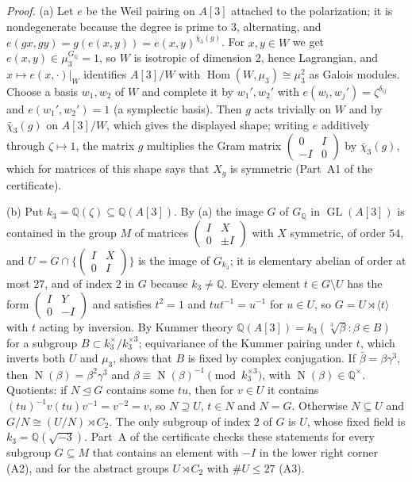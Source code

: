 \documentclass[11pt]{article}
\newcommand{\Q}{\mathbb Q}
\newcommand{\sd}{\mathbin{\rtimes}}
\DeclareMathOperator{\GL}{GL}
\DeclareMathOperator{\Hom}{Hom}
\DeclareMathOperator{\Norm}{N}
\begin{document}
\emph{Proof.} (a) Let \(e\) be the Weil pairing on \(A[3]\) attached to the polarization; it is nondegenerate
because the degree is prime to \(3\), alternating, and \(e(gx,gy)=g(e(x,y))=e(x,y)^{\bar\chi_3(g)}\). For
\(x,y\in W\) we get \(e(x,y)\in\mu_3^{G_{\Q}}=1\), so \(W\) is isotropic of dimension \(2\), hence Lagrangian, and
\(x\mapsto e(x,\cdot)|_W\) identifies \(A[3]/W\) with \(\Hom(W,\mu_3)\cong\mu_3^2\) as Galois modules. Choose a basis
\(w_1,w_2\) of \(W\) and complete it by \(w_1',w_2'\) with \(e(w_i,w_j')=\zeta^{\delta_{ij}}\) and
\(e(w_1',w_2')=1\) (a symplectic basis). Then \(g\) acts trivially on \(W\) and by \(\bar\chi_3(g)\) on \(A[3]/W\),
which gives the displayed shape; writing \(e\) additively through \(\zeta\mapsto1\), the matrix \(g\) multiplies the
Gram matrix \(\left(\begin{smallmatrix}0&I\\-I&0\end{smallmatrix}\right)\) by \(\bar\chi_3(g)\), which for
matrices of this shape says that \(X_g\) is symmetric (Part~A1 of the certificate).

(b) Put \(k_3=\Q(\zeta)\subseteq\Q(A[3])\). By (a) the image \(G\) of \(G_{\Q}\) in \(\GL(A[3])\) is contained in the
group \(M\) of matrices \(\left(\begin{smallmatrix}I&X\\0&\pm I\end{smallmatrix}\right)\) with \(X\) symmetric, of
order \(54\), and \(U=G\cap\{\left(\begin{smallmatrix}I&X\\0&I\end{smallmatrix}\right)\}\) is the image of
\(G_{k_3}\); it is elementary abelian of order at most \(27\), and of index \(2\) in \(G\) because
\(k_3\neq\Q\). Every element \(t\in G\setminus U\) has the form
\(\left(\begin{smallmatrix}I&Y\\0&-I\end{smallmatrix}\right)\) and satisfies \(t^2=1\) and \(tut^{-1}=u^{-1}\) for
\(u\in U\), so \(G=U\sd\langle t\rangle\) with \(t\) acting by inversion. By Kummer theory
\(\Q(A[3])=k_3(\sqrt[3]{\beta}:\beta\in B)\) for a subgroup \(B\subset k_3^\times/k_3^{\times3}\); equivariance of
the Kummer pairing under \(t\), which inverts both \(U\) and \(\mu_3\), shows that \(B\) is fixed by complex
conjugation. If \(\bar\beta=\beta\gamma^3\), then \(\Norm(\beta)=\beta^2\gamma^3\) and
\(\beta\equiv\Norm(\beta)^{-1}\pmod{k_3^{\times3}}\), with \(\Norm(\beta)\in\Q^\times\). Quotients: if
\(N\trianglelefteq G\) contains some \(tu\), then for \(v\in U\) it contains \((tu)^{-1}v(tu)v^{-1}=v^{-2}=v\), so
\(N\supseteq U\), \(t\in N\) and \(N=G\). Otherwise \(N\subseteq U\) and \(G/N\cong(U/N)\sd C_2\). The only subgroup
of index \(2\) of \(G\) is \(U\), whose fixed field is \(k_3=\Q(\sqrt{-3})\). Part~A of the certificate checks these
statements for every subgroup \(G\subseteq M\) that contains an element with \(-I\) in the lower right corner
(A2), and for the abstract groups \(U\sd C_2\) with \(\#U\le27\) (A3).
\end{document}
